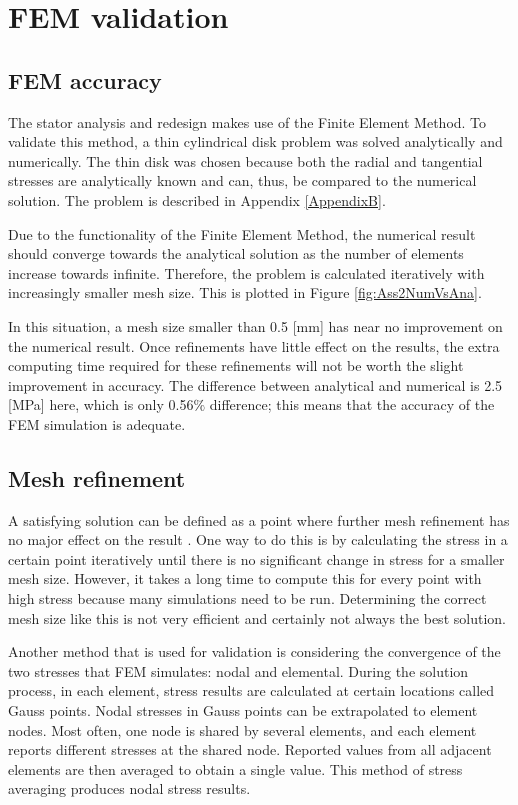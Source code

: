 \section{FEM validation}
\label{Chap:fem_software}

\subsection{FEM accuracy}

The stator analysis and redesign makes use of the Finite Element Method. To validate this method, a thin cylindrical disk problem was solved analytically and numerically. The thin disk was chosen because both the radial and tangential stresses are analytically known and can, thus, be compared to the numerical solution. The problem is described in Appendix \ref{AppendixB}.

Due to the functionality of the Finite Element Method, the numerical result should converge towards the analytical solution as the number of elements increase towards infinite. Therefore, the problem is calculated iteratively with increasingly smaller mesh size. This is plotted in Figure \ref{fig:Ass2NumVsAna}.

In this situation, a mesh size smaller than 0.5 [mm] has near no improvement on the numerical result. Once refinements have little effect on the results, the extra computing time required for these refinements will not be worth the slight improvement in accuracy. The difference between analytical and numerical is 2.5 [MPa] here, which is only 0.56$\%$ difference; this means that the accuracy of the FEM simulation is adequate.

\subsection{Mesh refinement}
\label{Meshrefinement}

A satisfying solution can be defined as a point where further mesh refinement has no major effect on the result \cite{meshrefinement}. One way to do this is by calculating the stress in a certain point iteratively until there is no significant change in stress for a smaller mesh size. However, it takes a long time to compute this for every point with high stress because many simulations need to be run. Determining the correct mesh size like this is not very efficient and certainly not always the best solution.

Another method that is used for validation is considering the convergence of the two stresses that FEM simulates: nodal and elemental. During the solution process, in each element, stress results are calculated at certain locations called Gauss points. Nodal stresses in Gauss points can be extrapolated to element nodes. Most often, one node is shared by several elements, and each element reports different stresses at the shared node. Reported values from all adjacent elements are then averaged to obtain a single value. This method of stress averaging produces nodal stress results. 

